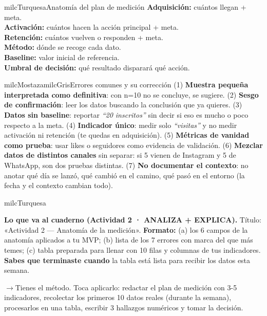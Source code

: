 \documentclass[11pt,letterpaper]{article}
\newcommand{\puente}[1]{%
  \begin{puentebox}%
    \textcolor{milcGradeDark}{$\rightarrow$}\hspace{2mm}#1%
  \end{puentebox}%
}
\begin{document}
\begin{drawbox}{milcTurquesa}{Anatomía del plan de medición}
\textbf{Adquisición:} cuántos llegan + meta. \\[1mm] \textbf{Activación:} cuántos hacen la acción principal + meta. \\[1mm] \textbf{Retención:} cuántos vuelven o responden + meta. \\[1mm] \textbf{Método:} dónde se recoge cada dato. \\[1mm] \textbf{Baseline:} valor inicial de referencia. \\[1mm] \textbf{Umbral de decisión:} qué resultado disparará qué acción.
\end{drawbox}

\begin{softbox}{milcMostaza}{milcGris}{Errores comunes y su corrección}
(1) \textbf{Muestra pequeña interpretada como definitiva}: con n=10 no se concluye, se sugiere. (2) \textbf{Sesgo de confirmación}: leer los datos buscando la conclusión que ya quieres. (3) \textbf{Datos sin baseline}: reportar \emph{``20 inscritos''} sin decir si eso es mucho o poco respecto a la meta. (4) \textbf{Indicador único}: medir solo \emph{``visitas''} y no medir activación ni retención (te quedas en adquisición). (5) \textbf{Métricas de vanidad como prueba}: usar likes o seguidores como evidencia de validación. (6) \textbf{Mezclar datos de distintos canales} sin separar: si 5 vienen de Instagram y 5 de WhatsApp, son dos pruebas distintas. (7) \textbf{No documentar el contexto}: no anotar qué día se lanzó, qué cambió en el camino, qué pasó en el entorno (la fecha y el contexto cambian todo).
\end{softbox}

\begin{infoband}{milcTurquesa}


\textbf{Lo que va al cuaderno (Actividad 2 · ANALIZA + EXPLICA).} Título: «Actividad 2 --- Anatomía de la medición». \textbf{Formato:} (a) los 6 campos de la anatomía aplicados a tu MVP; (b) lista de los 7 errores con marca del que más temes; (c) tabla preparada para llenar con 10 filas y columnas de tus indicadores. \textbf{Sabes que terminaste cuando} la tabla está lista para recibir los datos esta semana.
\end{infoband}

\puente{Tienes el método. Toca aplicarlo: redactar el plan de medición con 3-5 indicadores, recolectar los primeros 10 datos reales (durante la semana), procesarlos en una tabla, escribir 3 hallazgos numéricos y tomar la decisión.}
\end{document}
